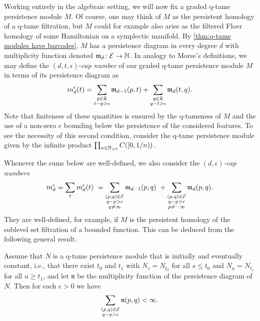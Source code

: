 Working entirely in the algebraic setting, we will now fix a graded q-tame persistence module $M$.
Of course, one may think of $M$ as the persistent homology of a q-tame filtration, but $M$ could for example also arise as the filtered Floer homology of some Hamiltonian on a symplectic manifold.
By \cref{thm:q-tame modules have barcodes}, $M$ has a persistence diagram in every degree $d$ with multiplicity function denoted $\mathfrak{m}_d \colon \mathcal{E} \to \mathbb{N}$.
In analogy to Morse's definitions, we may define the $(d, t, \epsilon)$-\textit{cap number} of our graded q-tame persistence module $M$ in terms of its persistence diagram as
\begin{equation*}
m_{d}^{\epsilon}(t) =
\sum_{\substack{p \in \mathbb{R} \\ t - p > \epsilon}} \mathfrak{m}_{d-1}(p, t) +
\sum_{\substack{q \in \mathbb{R} \\ q - t > \epsilon}} \mathfrak{m}_d(t, q).
\end{equation*}
Note that finiteness of these quantities is ensured by the q-tameness of $M$ and the use of a non-zero $e$ bounding below the persistence of the considered features.
To see the necessity of this second condition, consider the q-tame persistence module given by the infinite product $\prod_{n \in \mathbb{N}_{> 0}} C([0,1/n))$.

Whenever the sums below are well-defined, we also consider the \emph{$(d,\epsilon)$-cap numbers} 
\begin{equation} \label{e:cap numbers}
m_{d}^{\epsilon} =
\sum_{t} m_{d}^{\epsilon}(t) \ =
\sum_{\substack{(p,q) \in \mathcal{E} \\ q - p > \epsilon \\ q \neq \infty}} \mathfrak{m}_{d-1}(p,q) \ +
\sum_{\substack{(p,q) \in \mathcal{E} \\ q - p > \epsilon \\ p \neq -\infty}}\mathfrak{m}_d(p,q).
\end{equation} 
They are well-defined, for example, if $M$ is the persistent homology of the sublevel set filtration of a bounded function.
This can be deduced from the following general result.

\begin{thm}
    Assume that $N$ is a q-tame persistence module that is initially and eventually constant, i.e., that there exist $t_0$ and $t_1$ with $N_s = N_{t_0}$ for all $s \leq t_0$ and $N_u = N_{t_1}$ for all $u \geq t_1$, and let $\mathfrak{n}$ be the multiplicity function of the persistence diagram of $N$.
    Then for each $\epsilon > 0$ we have 
    \begin{equation*}
    \sum_{ \substack{ (p,q) \in \mathcal{E} \\ q-p > \epsilon } } \mathfrak{n} (p,q) < \infty.
    \end{equation*}
\end{thm}

